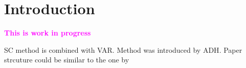 \section{Introduction}

\textcolor{magenta}{\textbf{This is work in progress}}

\ac{SC} method is combined with \ac{VAR}. Method was introduced by \ac{ADH}. Paper strcuture could be similar to the one by \cite{doudchenko:2016}